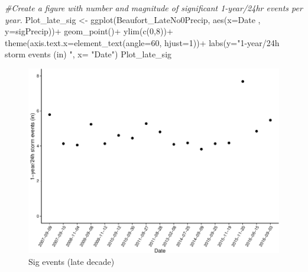 \documentclass[
  12pt,
]{article}
\newenvironment{Shaded}{\begin{snugshade}}{\end{snugshade}}
\newcommand{\AttributeTok}[1]{\textcolor[rgb]{0.77,0.63,0.00}{#1}}
\newcommand{\CommentTok}[1]{\textcolor[rgb]{0.56,0.35,0.01}{\textit{#1}}}
\newcommand{\DecValTok}[1]{\textcolor[rgb]{0.00,0.00,0.81}{#1}}
\newcommand{\FunctionTok}[1]{\textcolor[rgb]{0.00,0.00,0.00}{#1}}
\newcommand{\NormalTok}[1]{#1}
\newcommand{\OtherTok}[1]{\textcolor[rgb]{0.56,0.35,0.01}{#1}}
\newcommand{\SpecialCharTok}[1]{\textcolor[rgb]{0.00,0.00,0.00}{#1}}
\newcommand{\StringTok}[1]{\textcolor[rgb]{0.31,0.60,0.02}{#1}}
\begin{document}
\newpage

\begin{Shaded}
\begin{Highlighting}[]
\CommentTok{\#Create a figure with number and magnitude of significant 1{-}year/24hr events per year.}
\NormalTok{Plot\_late\_sig }\OtherTok{\textless{}{-}} \FunctionTok{ggplot}\NormalTok{(Beaufort\_LateNo0Precip, }
                        \FunctionTok{aes}\NormalTok{(}\AttributeTok{x=}\NormalTok{Date , }\AttributeTok{y=}\NormalTok{sigPrecip))}\SpecialCharTok{+}
  \FunctionTok{geom\_point}\NormalTok{()}\SpecialCharTok{+}
  \FunctionTok{ylim}\NormalTok{(}\FunctionTok{c}\NormalTok{(}\DecValTok{0}\NormalTok{,}\DecValTok{8}\NormalTok{))}\SpecialCharTok{+}
  \FunctionTok{theme}\NormalTok{(}\AttributeTok{axis.text.x=}\FunctionTok{element\_text}\NormalTok{(}\AttributeTok{angle=}\DecValTok{60}\NormalTok{, }\AttributeTok{hjust=}\DecValTok{1}\NormalTok{))}\SpecialCharTok{+}
  \FunctionTok{labs}\NormalTok{(}\AttributeTok{y=}\StringTok{"1{-}year/24h storm events (in) "}\NormalTok{, }\AttributeTok{x=} \StringTok{"Date"}\NormalTok{)}
\NormalTok{Plot\_late\_sig}
\end{Highlighting}
\end{Shaded}

\begin{figure}

{\centering \includegraphics{Final_Project_Thornton_Katayama_Ngenzi_files/figure-latex/late plot 1-1} 

}

\caption{Sig events (late decade)}\label{fig:late plot 1}
\end{figure}
\newpage
\end{document}
